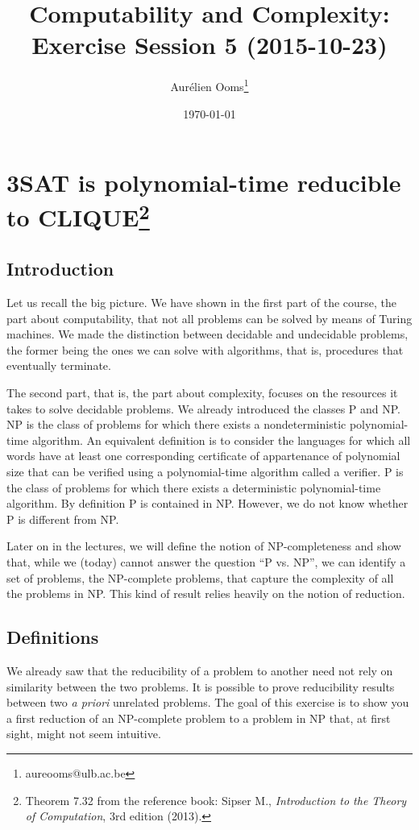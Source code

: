 \documentclass{article}
\title{Computability and Complexity:\\Exercise Session 5 (2015-10-23)}
\author{Aurélien Ooms\footnote{aureooms@ulb.ac.be}}
\date{\today}
\begin{document}
\maketitle
\tableofcontents

\section{3SAT is polynomial-time reducible to CLIQUE\footnote{%
Theorem 7.32 from the reference book: Sipser M.,
\emph{Introduction to the Theory of Computation}, 3rd edition (2013).}}

\subsection{Introduction}

Let us recall the big picture. We have shown in the first part of the course,
the part about computability, that not all problems can be solved by means of
Turing machines. We made the distinction between decidable and undecidable
problems, the former being the ones we can solve with algorithms, that is,
procedures that eventually terminate.

The second part, that is, the part about complexity, focuses on the resources
it takes to solve decidable problems. We already introduced the classes P and
NP. NP is the class of problems for which there exists a nondeterministic
polynomial-time algorithm. An equivalent definition is to consider the
languages for which all words have at least one corresponding certificate of
appartenance of polynomial size that can be verified using a polynomial-time
algorithm called a verifier. P is the class of problems for which there exists
a deterministic polynomial-time algorithm. By definition P is contained in NP.
However, we do not know whether P is different from NP.

Later on in the lectures, we will define the notion of NP-completeness and show
that, while we (today) cannot answer the question ``P vs. NP'', we can identify
a set of problems, the NP-complete problems, that capture the complexity of all
the problems in NP. This kind of result relies heavily on the notion of
reduction.

\subsection{Definitions}

We already saw that the reducibility of a problem to
another need not rely on similarity between the two problems. It is
possible to prove reducibility results between two \emph{a priori} unrelated problems.
The goal of this exercise is to show you a first reduction of an NP-complete
problem to a problem in NP that, at first sight, might not seem intuitive.
\end{document}
